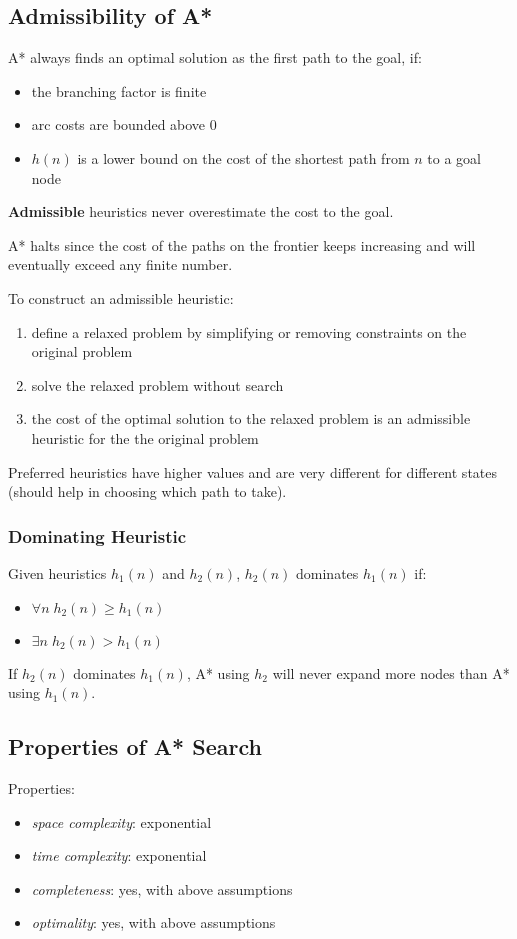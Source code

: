 \documentclass[11pt]{article}
\begin{document}
\subsection{Admissibility of A*}
\label{sec:orga86f64d}
A* always finds an optimal solution as the first path to the goal, if:
\begin{itemize}
\item the branching factor is finite
\item arc costs are bounded above 0
\item \(h(n)\) is a lower bound on the cost of the shortest path from \(n\) to a goal node
\end{itemize}

\textbf{Admissible} heuristics never overestimate the cost to the goal.

A* halts since the cost of the paths on the frontier keeps increasing and will eventually exceed
any finite number.

To construct an admissible heuristic:
\begin{enumerate}
\item define a relaxed problem by simplifying or removing constraints on the original problem
\item solve the relaxed problem without search
\item the cost of the optimal solution to the relaxed problem is an admissible heuristic for the the
original problem
\end{enumerate}

Preferred heuristics have higher values and are very different for different states (should help in
choosing which path to take).
\subsubsection{Dominating Heuristic}
\label{sec:org9d47c89}
Given heuristics \(h_{1}(n)\) and \(h_{2}(n)\), \(h_{2}(n)\) dominates \(h_{1}(n)\) if:
\begin{itemize}
\item \(\forall n \; h_{2}(n) \ge h_{1} (n)\)
\item \(\exists n \; h_{2}(n) > h_{1} (n)\)
\end{itemize}

If \(h_{2}(n)\) dominates \(h_{1}(n)\), A* using \(h_{2}\) will never expand more nodes than A* using
\(h_{1}(n)\).
\subsection{Properties of A* Search}
\label{sec:orgdf8161f}
Properties:
\begin{itemize}
\item \emph{space complexity}: exponential
\item \emph{time complexity}: exponential
\item \emph{completeness}: yes, with above assumptions
\item \emph{optimality}: yes, with above assumptions
\end{itemize}
\end{document}
